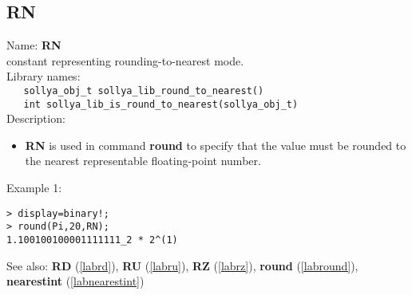 \subsection{RN}
\label{labrn}
\noindent Name: \textbf{RN}\\
\phantom{aaa}constant representing rounding-to-nearest mode.\\[0.2cm]
\noindent Library names:\\
\verb|   sollya_obj_t sollya_lib_round_to_nearest()|\\
\verb|   int sollya_lib_is_round_to_nearest(sollya_obj_t)|\\[0.2cm]
\noindent Description: \begin{itemize}

\item \textbf{RN} is used in command \textbf{round} to specify that the value must be rounded
   to the nearest representable floating-point number.
\end{itemize}
\noindent Example 1: 
\begin{center}\begin{minipage}{15cm}\begin{Verbatim}[frame=single,commandchars=\\\|\~]
> display=binary!;
> round(Pi,20,RN);
1.100100100001111111_2 * 2^(1)
\end{Verbatim}
\end{minipage}\end{center}
See also: \textbf{RD} (\ref{labrd}), \textbf{RU} (\ref{labru}), \textbf{RZ} (\ref{labrz}), \textbf{round} (\ref{labround}), \textbf{nearestint} (\ref{labnearestint})
